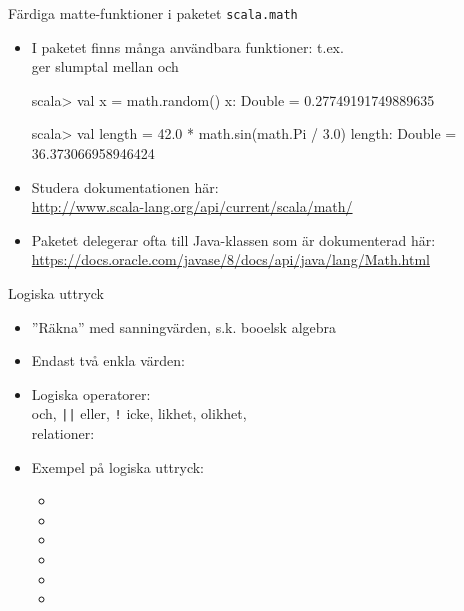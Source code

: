\documentclass{simpleslides}
\begin{document}
    
    \begin{Slide}{Färdiga matte-funktioner i paketet \texttt{scala.math}}\SlideFontSmall
    \begin{itemize}
    \item I paketet \texttt{} finns många användbara funktioner: t.ex.\\
     ger slumptal mellan  och 
    \begin{REPLnonum}
    scala> val x = math.random()
    x: Double = 0.27749191749889635
    
    scala> val length = 42.0 * math.sin(math.Pi / 3.0)
    length: Double = 36.373066958946424
    \end{REPLnonum}
    
    \item Studera dokumentationen här: \\{\SlideFontTiny
    \url{http://www.scala-lang.org/api/current/scala/math/}}
    
    \item Paketet  delegerar ofta till Java-klassen \texttt{} som är dokumenterad här: \\{\SlideFontTiny
    \url{https://docs.oracle.com/javase/8/docs/api/java/lang/Math.html}}
    
    \end{itemize}
    \end{Slide}
    
    
    
     
\begin{Slide}{Logiska uttryck}
\begin{itemize}
\item ''Räkna'' med sanningvärden,
s.k. booelsk algebra %

\item Endast två enkla värden: 
\item Logiska operatorer:\\
\code{&&} och, \texttt{||} eller, \texttt{!} icke, \code{==} likhet, \code{!=} olikhet, \\
relationer: \code{> < >= <=}

\item Exempel på logiska uttryck:
\begin{itemize}
\item[] 
\item[] 
\item[] 
\item[] 
\item[] 
\item[] 
\end{itemize}

\end{itemize}
\end{Slide}
    
\end{document}
